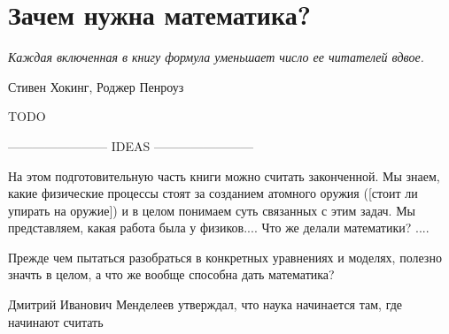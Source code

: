\chapter{Зачем нужна математика?}\label{why_math}

\epigraph{\emph{Каждая включенная в книгу формула \break уменьшает число ее читателей вдвое.}}{Стивен Хокинг, Роджер Пенроуз}

TODO

------------------------ IDEAS ------------------------ 

На этом подготовительную часть книги можно считать законченной.
Мы знаем, какие физические процессы стоят за созданием атомного оружия ([стоит ли упирать на оружие]) и в целом понимаем суть связанных с этим задач.
Мы представляем, какая работа была у физиков....
Что же делали математики? ....


Прежде чем пытаться разобраться в конкретных уравнениях и моделях, полезно значть в целом, а что же вообще способна дать математика?


Дмитрий Иванович Менделеев утверждал, что наука начинается там, где начинают считать

